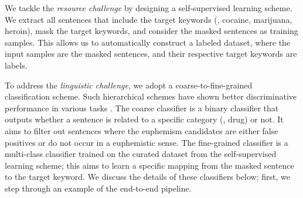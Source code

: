 
We tackle the \textit{resource challenge} by designing a self-supervised learning scheme. 
We extract all sentences that include the target keywords (\eg, cocaine, marijuana, heroin), mask the target keywords, and consider the masked sentences as training samples. 
This allows us to automatically construct a labeled dataset, where the input samples are the masked sentences, and their respective target keywords are labels.

To address the \textit{linguistic challenge}, we adopt a coarse-to-fine-grained classification scheme. 
Such hierarchical schemes have shown better discriminative performance in various tasks \cite{huo2019coarse,liu2018global,li2019exploiting}. 
The coarse classifier is a binary classifier that outputs whether a sentence is related to a specific category (\eg, drug) or not. 
It aims to filter out sentences where the euphemism candidates are either false positives or do not occur in a euphemistic sense. 
The fine-grained classifier is a multi-class classifier trained on the curated dataset from the self-supervised learning scheme; this aims to learn a specific mapping from the masked sentence to the target keyword. 
We discuss the details of these classifiers below; first, we step through an example  of the end-to-end pipeline.

